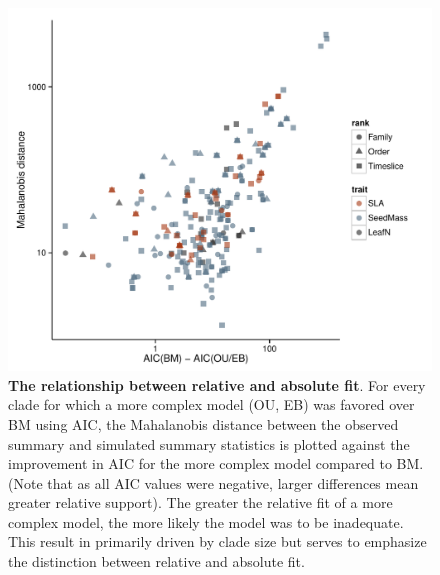 \documentclass[a4paper,12pt]{article}
\begin{document}
\begin{figure}[p]
  \centering
  \includegraphics[scale=0.9]{figs/ad-aic}
  \caption{\textbf{The relationship between relative and absolute fit}. For every clade for which a more complex model (OU, EB) was favored over BM using AIC, the Mahalanobis distance between the observed summary and simulated summary statistics is plotted against the improvement in AIC for the more complex model compared to BM. (Note that as all AIC values were negative, larger differences mean greater relative support). The greater the relative fit of a more complex model, the more likely the model was to be inadequate. This result in primarily driven by clade size but serves to emphasize the distinction between relative and absolute fit.}
  \label{fig:supp-ad-aic}
\end{figure} 
\end{document}
